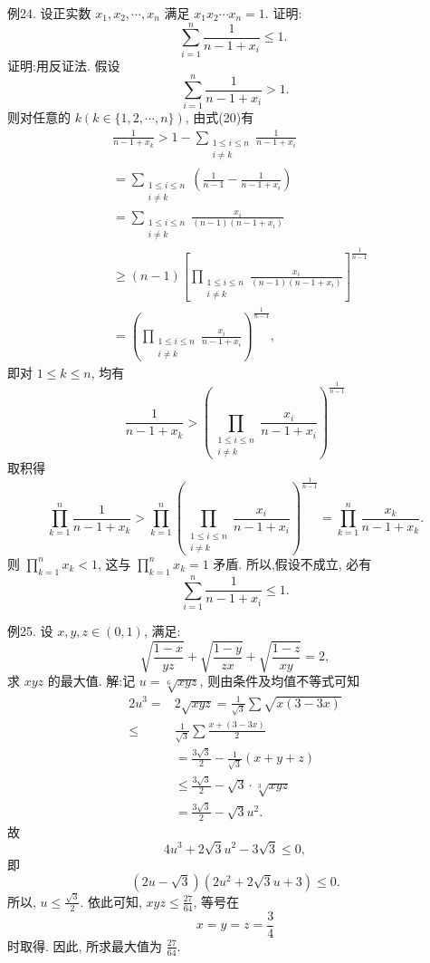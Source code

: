例24. 设正实数 $x_1, x_2, \cdots, x_n$ 满足 $x_1 x_2 \cdots x_n=1$. 证明:
$$
\sum_{i=1}^n \frac{1}{n-1+x_i} \leqslant 1 \text {. }
$$
证明:用反证法.
假设
$$
\sum_{i=1}^n \frac{1}{n-1+x_i}>1 . \label{(20)}
$$
则对任意的 $k(k \in\{1,2, \cdots, n\})$, 由式(20)有
$$
\begin{aligned}
& \frac{1}{n-1+x_k}>1-\sum_{\substack{1 \leqslant i \leqslant n \\
i \neq k}} \frac{1}{n-1+x_i} \\
&=\sum_{\substack{1 \leqslant i \leqslant n \\
i \neq k}}\left(\frac{1}{n-1}-\frac{1}{n-1+x_i}\right) \\
&=\sum_{\substack{1 \leqslant i \leqslant n \\
i \neq k}} \frac{x_i}{(n-1)\left(n-1+x_i\right)} \\
& \geqslant(n-1)\left[\prod_{\substack{1 \leqslant i \leqslant n \\
i \neq k}} \frac{x_i}{(n-1)\left(n-1+x_i\right)}\right]^{\frac{1}{n-1}} \\
&=\left(\prod_{\substack{1 \leqslant i \leqslant n \\
i \neq k}} \frac{x_i}{n-1+x_i}\right)^{\frac{1}{n-1}},
\end{aligned}
$$
即对 $1 \leqslant k \leqslant n$, 均有
$$
\frac{1}{n-1+x_k}>\left(\prod_{\substack{1 \leqslant i \leqslant n \\ i \neq k}} \frac{x_i}{n-1+x_i}\right)^{\frac{1}{n-1}}
$$
取积得
$$
\prod_{k=1}^n \frac{1}{n-1+x_k}>\prod_{k=1}^n\left(\prod_{\substack{1 \leqslant i \leqslant n \\ i \neq k}} \frac{x_i}{n-1+x_i}\right)^{\frac{1}{n-1}}=\prod_{k=1}^n \frac{x_k}{n-1+x_k} .
$$
则 $\prod_{k=1}^n x_k<1$, 这与 $\prod_{k=1}^n x_k=1$ 矛盾.
所以,假设不成立, 必有
$$
\sum_{i=1}^n \frac{1}{n-1+x_i} \leqslant 1 .
$$



例25. 设 $x, y, z \in(0,1)$, 满足:
$$
\sqrt{\frac{1-x}{y z}}+\sqrt{\frac{1-y}{z x}}+\sqrt{\frac{1-z}{x y}}=2,
$$
求 $x y z$ 的最大值.
解:记 $u=\sqrt[6]{x y z}$, 则由条件及均值不等式可知
$$
\begin{aligned}
2 u^3= & 2 \sqrt{x y z}=\frac{1}{\sqrt{3}} \sum \sqrt{x(3-3 x)} \\
\leqslant & \frac{1}{\sqrt{3}} \sum \frac{x+(3-3 x)}{2} \\
& =\frac{3 \sqrt{3}}{2}-\frac{1}{\sqrt{3}}(x+y+z) \\
& \leqslant \frac{3 \sqrt{3}}{2}-\sqrt{3} \cdot \sqrt[3]{x y z} \\
& =\frac{3 \sqrt{3}}{2}-\sqrt{3} u^2 .
\end{aligned}
$$
故
$$
4 u^3+2 \sqrt{3} u^2-3 \sqrt{3} \leqslant 0,
$$
即
$$
(2 u-\sqrt{3})\left(2 u^2+2 \sqrt{3} u+3\right) \leqslant 0 .
$$
所以, $u \leqslant \frac{\sqrt{3}}{2}$. 依此可知, $x y z \leqslant \frac{27}{64}$, 等号在
$$
x=y=z=\frac{3}{4}
$$
时取得.
因此, 所求最大值为 $\frac{27}{64}$.



